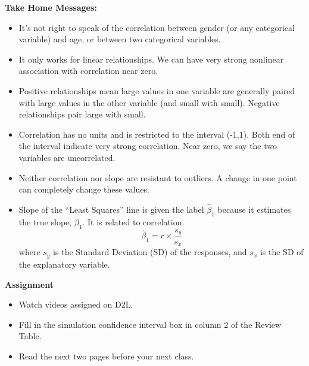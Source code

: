 \begin{center}
  {\bf Take Home Messages:}\vspace{-.4cm}
\end{center}
\begin{itemize}
\item It's not right to speak of the correlation between gender (or any
  categorical variable) and age, or between two categorical variables.
\item It only works for linear relationships.  We can have very strong
  nonlinear association with correlation near zero.
\item Positive relationships mean large values in one variable are
  generally  paired  with large values  in  the other variable
  (and small with small).  Negative relationships pair large with small.
\item Correlation has no units and is restricted to the interval
  (-1,1). Both end of the interval indicate very strong
  correlation. Near zero, we say the two variables are uncorrelated.

\item Neither correlation nor slope are resistant to outliers.  A
  change in one point can completely change these values.
\item Slope of the ``Least Squares'' line is given the label
  $\hat{\beta}_1$ because it estimates the true slope, $\beta_1$.  It is
  related to correlation.  
  $$  \hat{\beta}_1 = r \times\frac{s_y}{s_x}$$
  where $s_y$ is the Standard Deviation (SD) of the responses, and $s_x$ is
  the SD of the explanatory variable.
\end{itemize}




\noindent
{\bf Assignment} \vspace{-.2in}
\begin{itemize}
\item Watch videos assigned on D2L.
\item Fill in the simulation confidence interval box in column 2 of
  the Review Table.
\item Read the next two pages before your next class.
\end{itemize}

